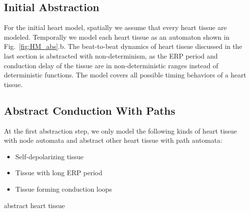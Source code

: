 \documentclass[openany]{now} %
\newcommand{\figref}[1]{Fig.~\ref{fig:#1}}
\begin{document}
\subsection{Initial Abstraction}
For the initial heart model, spatially we assume that every heart tissue are modeled. Temporally we model each heart tissue as an automaton shown in \figref{HM_abs}.b. The beat-to-beat dynamics of heart tissue discussed in the last section is abstracted with non-determinism, as the ERP period and conduction delay of the tissue are in non-deterministic ranges instead of deterministic functions. The model covers all possible timing behaviors of a heart tissue. 

\subsection{Abstract Conduction With Paths}
At the first abstraction step, we only model the following kinds of heart tissue with node automata and abstract other heart tissue with path automata:
\begin{itemize}
	\item Self-depolarizing tissue
    \item Tissue with long ERP period
    \item Tissue forming conduction loops
\end{itemize}


abstract heart tissue
\end{document}

